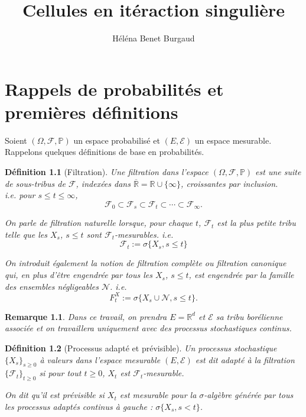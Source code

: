 \documentclass[openany]{book}
\title{Cellules en itéraction singulière}
\author{Héléna Benet Burgaud}
\newcommand{\F}{\mathscr{F}}
\newcommand{\N}{\mathscr{N}}
\newcommand{\carE}{\mathscr{E}}
\renewcommand{\P}{\mathds{P}}
\newcommand{\R}{\mathbb{R}}
\newcommand{\1}{\mathbbm{1}}
\theoremstyle{thmfont}
\theoremstyle{deffont}
\newtheorem{definition}[definition]{Définition}
\theoremstyle{thmfont}
\theoremstyle{deffont}
\newtheorem*{remark}{Remarque}
\begin{document}

\tableofcontents
\clearpage
{} %
\setcounter{page}{1}
\let\cleardoublepage\relax

\chapter{Rappels de probabilités et premières définitions}

Soient $(\Omega, \F, \P )$ un espace probabilisé et $(E, \carE)$ un espace mesurable. Rappelons quelques définitions de base en probabilités.

\begin{definition}[Filtration] Une \textit{filtration} dans l'espace $(\Omega, \F, \P )$ est une suite de sous-tribus de $\F$, indexées dans $\overline{\R} = \R \cup \{\infty\}$, croissantes par inclusion.\\
i.e. pour $s \leq t \leq \infty$,
$$\F_0 \subset \F_s \subset \F_t\subset \cdots \subset \F_\infty .$$

On parle de \textit{filtration naturelle} lorsque, pour chaque $t$, $\F_t$ est la plus petite tribu telle que les $X_s$, $s\leq t$ sont $\F_t$-mesurables. i.e.
$$\F_t := \sigma\{X_s, s\leq t\}$$

On introduit également la notion de \textit{filtration complète} ou
\textit{filtration canonique} qui, en plus d'être engendrée par tous les $X_s$, $s \leq t$, est engendrée par la famille des ensembles négligeables $\N$. i.e.
$$F^X_t := \sigma\{X_s\cup \N, s\leq t\}.$$

\label{def:filtration}
\end{definition}

\begin{remark}
Dans ce travail, on prendra $E = \R^d$ et $\carE$ sa tribu borélienne associée et on travaillera uniquement avec des processus stochastiques continus.
\end{remark}

\begin{definition}[Processus adapté et prévisible] Un processus stochastique $\{X_s\}_{s\ge0}$ à valeurs dans l'espace mesurable $(E, \carE)$ est dit \textit{adapté} à la filtration $\{\F_t\}_{t\geq0}$ si pour tout $t\geq0$, $X_t$ est $\F_t$-mesurable.

  On dit qu'il est \textit{prévisible} si $X_t$ est mesurable pour la $\sigma$-algèbre générée par tous les processus adaptés continus à gauche : $\sigma\{X_s, s<t\}$.
\label{def:pr_adapte}
\end{definition}
\end{document}
